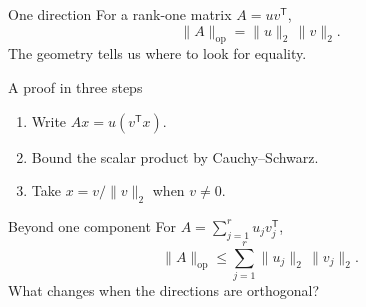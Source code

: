 \documentclass[aspectratio=169]{beamer}
\begin{document}
\begin{frame}{One direction}
\large
For a rank-one matrix $A=uv^{\mathsf T}$,
\[\|A\|_{\mathrm{op}}=\|u\|_2\,\|v\|_2.\]
\medskip
The geometry tells us where to look for equality.
\end{frame}
\begin{frame}{A proof in three steps}
\large
\begin{enumerate}
\item Write $Ax=u(v^{\mathsf T}x)$.
\item<2-> Bound the scalar product by Cauchy--Schwarz.
\item<3-> Take $x=v/\|v\|_2$ when $v\ne0$.
\end{enumerate}
\end{frame}
\begin{frame}{Beyond one component}
\large
For $A=\sum_{j=1}^r u_jv_j^{\mathsf T}$,
\[\|A\|_{\mathrm{op}}\leq\sum_{j=1}^r\|u_j\|_2\,\|v_j\|_2.\]
\medskip
What changes when the directions are orthogonal?
\end{frame}
\end{document}
